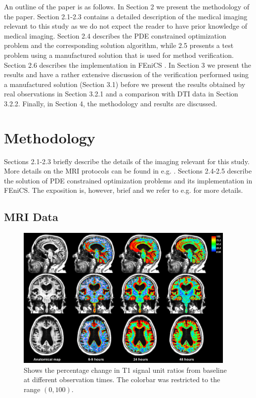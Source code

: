 \documentclass[12pt,a4paper]{article}
\begin{document}
An outline of the paper is as follows. 
In Section 2 we present the methodology of the paper. Section 2.1-2.3 contains a detailed description of the medical imaging 
relevant to this study as we do not expect the reader to have prior knowledge of medical imaging. Section 2.4
describes the PDE constrained optimization problem and the corresponding solution algorithm, while 2.5 presents
a test problem using a manufactured solution that is used for method verification. Section 2.6 describes the implementation 
in FEniCS \cite{LoggMardalEtAl2012a}. In Section 3 we present the results and have a rather extensive discussion of the verification performed
using a manufactured solution (Section 3.1) before we present the results obtained by real observations in Section 3.2.1    
and a comparison with DTI data in Section 3.2.2. Finally, in Section 4, the methodology and results are discussed.  
   
\section{Methodology}

Sections 2.1-2.3 briefly describe the details of the imaging relevant for this study. More details on the MRI protocols can be
found in e.g. \cite{ringstad2018brain}. Sections 2.4-2.5 describe the solution of PDE constrained optimization problems and
its implementation in FEniCS. The exposition is, however, brief and we refer to e.g. \cite{hinze2008optimization} for more details. 



\subsection{MRI Data}
\begin{figure}
\includegraphics[width=0.95\textwidth]{../PatID-new-100.png} 
\caption{Shows the percentage change in T1 signal unit ratios from baseline at different observation times. The colorbar was restricted to the range $(0,100)$. }
\label{fig1} 
\end{figure}
\end{document}
